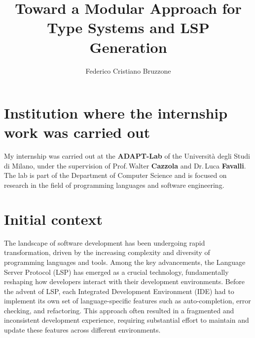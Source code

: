 \documentclass{adapt-lab}
\begin{document}
\title{Toward a Modular Approach for Type Systems and LSP \\ Generation \\}
\author{Federico Cristiano Bruzzone}

\makefirstpage

%
%

\break

\section{Institution where the internship work was carried out}

My internship was carried out at the \textbf{ADAPT-Lab} of the Universit\`a degli Studi di Milano, under the supervision of Prof.\,Walter \textbf{Cazzola} and Dr.\,Luca \textbf{Favalli}.
 The lab is part of the Department of Computer Science and is focused on research in the field of programming languages and software engineering.

\section{Initial context}

The landscape of software development has been undergoing rapid transformation, driven by the increasing complexity and diversity of programming languages and tools. Among the key advancements, the Language Server Protocol (LSP) has emerged as a crucial technology, fundamentally reshaping how developers interact with their development environments. Before the advent of LSP, each Integrated Development Environment (IDE) had to implement its own set of language-specific features such as auto-completion, error checking, and refactoring. This approach often resulted in a fragmented and inconsistent development experience, requiring substantial effort to maintain and update these features across different environments.
\end{document}

